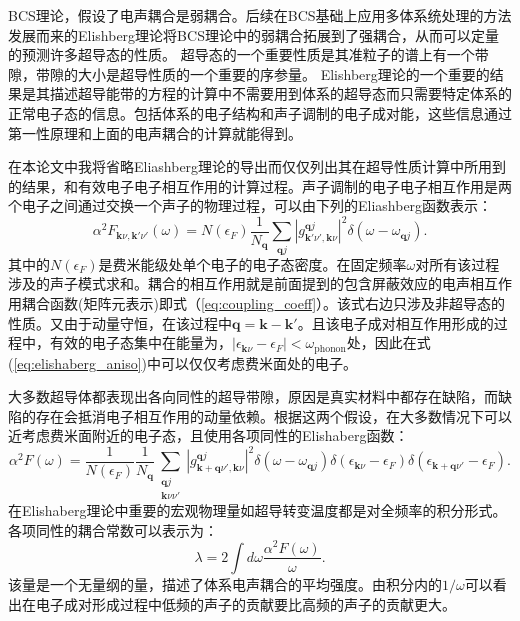 BCS理论，假设了电声耦合是弱耦合。后续在BCS基础上应用多体系统处理的方法\cite{scalapino1969electron}发展而来的Elishberg理论\cite{eliashberg1960interactions}将BCS理论中的弱耦合拓展到了强耦合，从而可以定量的预测许多超导态的性质。
超导态的一个重要性质是其准粒子的谱上有一个带隙，带隙的大小是超导性质的一个重要的序参量。
Elishberg理论的一个重要的结果是其描述超导能带的方程的计算中不需要用到体系的超导态而只需要特定体系的正常电子态的信息。包括体系的电子结构和声子调制的电子成对能，这些信息通过第一性原理和上面的电声耦合的计算就能得到。

在本论文中我将省略Eliashberg理论的导出而仅仅列出其在超导性质计算中所用到的结果，和有效电子电子相互作用的计算过程。声子调制的电子电子相互作用是两个电子之间通过交换一个声子的物理过程，可以由下列的Eliashberg函数表示：
\begin{equation}\label{eq:elishaberg_aniso}
  \alpha^2 F_{\bm{k}\nu,\bm{k}'\nu'}(\omega) =
  N(\epsilon_F) \frac{1}{N_{\bm{q}}} \sum_{\bm{q}j}
  |g^{\bm{q}j}_{\bm{k}'\nu',\bm{k}\nu}|^2 \delta(\omega-\omega_{\bm{q}j}).
\end{equation}
其中的$N(\epsilon_F)$是费米能级处单个电子的电子态密度。在固定频率$\omega$对所有该过程涉及的声子模式求和。耦合的相互作用就是前面提到的包含屏蔽效应的电声相互作用耦合函数(矩阵元表示)即式（\ref{eq:coupling_coeff}）。该式右边只涉及非超导态的性质。又由于动量守恒，在该过程中$\bm{q}=\bm{k}-\bm{k}'$。且该电子成对相互作用形成的过程中，有效的电子态集中在能量为，$|\epsilon_{\bm{k}\nu}-\epsilon_F|<\omega_{\mathrm{phonon}}$处，因此在式(\ref{eq:elishaberg_aniso})中可以仅仅考虑费米面处的电子\cite{allen1983theory}。

大多数超导体都表现出各向同性的超导带隙，原因是真实材料中都存在缺陷，而缺陷的存在会抵消电子相互作用的动量依赖。根据这两个假设，在大多数情况下可以近考虑费米面附近的电子态，且使用各项同性的Elishaberg函数：
\begin{equation}\label{eq:elishaberg_iso}
  \alpha^2 F(\omega) = \frac{1}{N(\epsilon_F)}\frac{1}{N_{\bm{q}}}
  \sum_{\substack{\bm{q}j \\ \bm{k}\nu\nu'}} |g^{\bm{q}j}_{\bm{k}+\bm{q}\nu',\bm{k}\nu}|^2
  \delta(\omega-\omega_{\bm{q}j})
  \delta(\epsilon_{\bm{k}\nu}-\epsilon_{F})
  \delta(\epsilon_{\bm{k}+\bm{q}\nu'}-\epsilon_F).
\end{equation}
在Elishaberg理论中重要的宏观物理量如超导转变温度都是对全频率的积分形式。各项同性的耦合常数可以表示为：
\begin{equation}\label{eq:lambda_coupling}
  \lambda = 2 \int d\omega \frac{\alpha^2 F(\omega)}{\omega}.
\end{equation}
该量是一个无量纲的量，描述了体系电声耦合的平均强度。由积分内的$1/\omega$可以看出在电子成对形成过程中低频的声子的贡献要比高频的声子的贡献更大。

